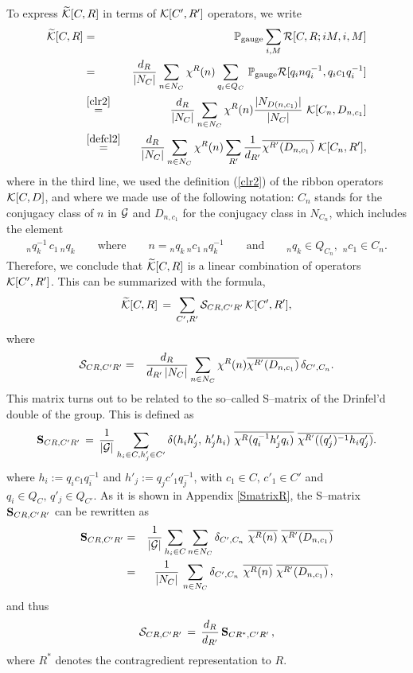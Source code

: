 \documentclass[nofootinbib,superscriptaddress,eqsecnum,tightenlines,11pt]{revtex4-1}
\def\nn{\nonumber}
\def\q{\qquad}
\def\ba{\begin{eqnarray}}
\def\ea{\end{eqnarray}}
\renewcommand{\tilde}{\widetilde}
\begin{document}
To express $\tilde {\cal K}[C,R]$ in terms of $ {\cal K}[C',R']$ operators, we write
\ba
\tilde {\cal K} [C,R]&=&{\mathbb P}_\text{gauge} \sum_{i,M}{\cal R}[C,R;iM,i,M]\nn\\&=&
 \frac{d_R}{|N_C|} \sum_{n\in N_C}  \chi^R(n)  \sum_{q_i \in Q_C} \, {\mathbb P}_\text{gauge}  {\cal R}[q_inq_i^{-1},q_i c_1 q^{-1}_i] \nn\\
 &\stackrel{\eqref{clr2}}{=}& \frac{d_R}{|N_C|} \sum_{n\in N_C}  \chi^R(n) \frac{    |N_{D(n,c_1)}| }{|N_C|}    \,\, {\cal K}[ C_n,D_{n,c_1}] \nn\\
 &\stackrel{\eqref{defcl2}}{=}& \frac{d_R}{|N_C|} \sum_{n\in N_C}   \chi^R(n)     \sum_{R'} \frac{1}{d_{R'}}\overline{\chi^{R'}( D_{n,c_1}) }\,\,{\cal K}[ C_n,R'] ,
\ea
where in the third line, we used the definition (\ref{clr2}) of the ribbon operators ${\cal K}[C,D]$, and where we made use of the following notation:
 $C_n$ stands for the conjugacy class of $n$ in ${\cal G}$ and $D_{n,c_1}$ for the conjugacy class in $N_{C_n}$, which includes the element
 \ba\label{3.39}
  {}_nq_{k}^{-1}\, c_1 \, {}_nq_{k}  \q \text{where}   \q n= {}_nq_{k} \, {}_nc_1\, {}_nq_{k}^{-1} \q \text{and} \q {}_nq_{k} \in Q_{C_n} ,\,\,{}_nc_1 \in C_n  .
\ea
Therefore, we conclude that $\tilde{\cal K}[C,R]$ is a linear combination of operators ${\cal K}[C',R']$. 
This can be summarized with the formula,
\ba
\tilde{\cal K}[C,R] \,=\, \sum_{C',R'}  {\cal S}_{CR,C'R'}  \, {\cal K}[C',R'],
\ea
where
\ba
{\cal S}_{CR,C'R'} &=&  \frac{d_R}{ d_{R'} \, |N_C|} \sum_{n\in N_C}  \chi^R(n)   \overline{\chi^{R'}( D_{n,c_1})} \, \delta_{C',C_n}     .
\ea
This matrix turns out to be related to the so--called S--matrix of the Drinfel'd double of the group.
This is defined as \cite{Pasquier,Verlinde} 
\ba\label{SmatrixV}
{\bf S}_{CR,C'R'} \,=\, \frac{1}{|\cal G|}  \sum_{h_i  \in C, h'_j \in C'}  \delta( h_i h'_j, \, h'_j h_i) \, \, \overline{\chi^R( q_i^{-1}h'_jq_i)} \,\, \overline{ \chi^{R'} ( (q'_j)^{-1} h_i q'_j) } .
\ea
where $h_i:= q_i c_1 q_i^{-1}$ and $h'_j:= q_j c'_1 q_j^{-1}$, with $c_1 \in C, \, c'_1 \in C'$ and $q_i \in Q_C, \, q'_j \in Q_{C'}$. 
As it is shown in Appendix \ref{SmatrixR}, the S--matrix ${\bf S}_{CR,C'R'}$ can be rewritten as
\ba\label{3.45}
{\bf S}_{CR,C'R'} &=& \frac{1}{|\cal G|}  \sum_{h_i  \in C}  \sum_{n \in N_C} \delta_{C',C_n}   \, \, \overline{\chi^R( n) }\,\, \overline{ \chi^{R'} ( D_{n,c_1})} \nn\\
 &=& \frac{1}{|N_C|}  \,  \sum_{n \in N_C} \delta_{C',C_n}   \, \, \overline{\chi^R ( n)} \,\, \overline{\chi^{R'}(D_{n,c_1}) }\,,
\ea
and thus 
\ba
{\cal S}_{CR,C'R'}\,=\, \frac{d_R}{d_{R'}} \, {\bf S}_{CR^*,C'R'}\,,
\ea
where $R^*$ denotes the contragredient representation to $R$. 
\end{document}
